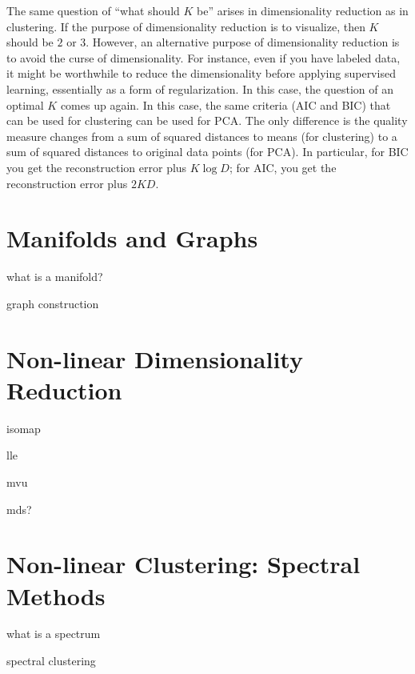 The same question of ``what should $K$ be'' arises in dimensionality
reduction as in clustering.  If the purpose of dimensionality
reduction is to visualize, then $K$ should be $2$ or $3$.  However, an
alternative purpose of dimensionality reduction is to avoid the curse
of dimensionality.  For instance, even if you have labeled data, it
might be worthwhile to reduce the dimensionality before applying
supervised learning, essentially as a form of regularization.  In this
case, the question of an optimal $K$ comes up again.  In this case,
the same criteria (AIC and BIC) that can be used for clustering can be
used for PCA.  The only difference is the quality measure changes from
a sum of squared distances to means (for clustering) to a sum of
squared distances to original data points (for PCA).  In particular,
for BIC you get the reconstruction error plus $K \log D$; for AIC, you
get the reconstruction error plus $2 K D$.




\section{Manifolds and Graphs}

what is a manifold?

graph construction

\section{Non-linear Dimensionality Reduction}

isomap

lle

mvu

mds?

\section{Non-linear Clustering: Spectral Methods}

what is a spectrum

spectral clustering

\begin{comment}
- pca
- lsa/svd
- mds
- manifold
- JL
- kmeans++
- hierarchical clustering
- spectral clustering
\end{comment}

\begin{exercises}
\begin{Ex}
\TODO

\begin{solution}
\TODO
\end{solution}
\end{Ex}

\end{exercises}


